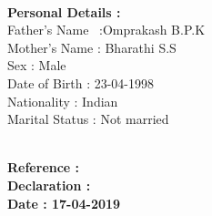 \documentclass[1pt]{article}
\begin{document}
\begin{flushleft}
				
			\hspace{1cm}\\ \hspace{1cm}
			
			
			{\small \textbf{ Personal Details :}}\\
			\hspace{1cm}Father's Name \ :Omprakash B.P.K\\	
			\hspace{1cm}Mother's Name : Bharathi S.S\\
			\hspace{1cm}Sex : Male\\	
			\hspace{1cm}Date of Birth : 23-04-1998\\
			\hspace{1cm}Nationality : Indian\\
			\hspace{1cm}Marital Status : Not married\\
			
			\hspace{1cm}\\ \hspace{1cm}
			
			{\small \textbf{Reference : }}\\
			{\small \textbf{Declaration : }}\\
			{\small \textbf{Date : 17-04-2019 }}\\
	\end{flushleft}
	
\end{document}
